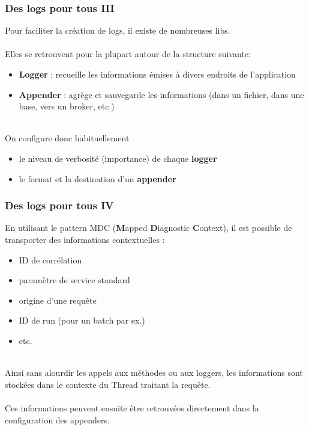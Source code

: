 \begin{frame}[fragile]
	\frametitle{Des logs pour tous III}

    Pour faciliter la cr\'{e}ation de logs, il existe de nombreuses libs.
    \\~\\
    Elles se retrouvent pour la plupart autour de la structure suivante:
     \begin{itemize}
    	\item \textbf{Logger} : recueille les informations \'{e}mises \`{a} divers endroits de l'application
        \item \textbf{Appender} : agr\`{e}ge et sauvegarde les informations (dans un fichier, dans une base, vers un broker, etc.)
    \end{itemize}
    ~\\
    On configure donc habituellement
    \begin{itemize}
    	\item le niveau de verbosit\'{e} (importance) de chaque \textbf{logger}
        \item le format et la destination d'un \textbf{appender}
    \end{itemize}
    
\end{frame}

\begin{frame}[fragile]
	\frametitle{Des logs pour tous IV}

    En utilisant le pattern MDC (\textbf{M}apped \textbf{D}iagnostic \textbf{C}ontext), il est possible de transporter des informations contextuelles : 
    \begin{itemize}
    	\item ID de corr\'{e}lation
        \item param\`{e}tre de service standard
        \item origine d'une requ\^{e}te
        \item ID de run (pour un batch par ex.)
        \item etc.
    \end{itemize}
    ~\\
    Ainsi sans alourdir les appels aux m\'{e}thodes ou aux loggers, les informations sont stock\'{e}es dans le contexte du Thread traitant la requ\^{e}te.
    \\~\\
    Ces informations peuvent ensuite \^{e}tre retrouv\'{e}es directement dans la configuration des appenders.
\end{frame}

